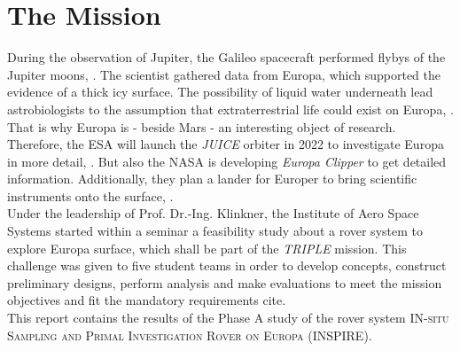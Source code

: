 %
%
%
\chapter{The Mission}
\label{chap:mission}

During the observation  of Jupiter, the Galileo spacecraft performed flybys of the Jupiter moons, \cite{Mission_01}.
The scientist gathered data from Europa, which supported the evidence of a thick icy surface.
The possibility of liquid water underneath lead astrobiologists to the assumption that extraterrestrial life could exist on Europa, \cite{Mission_02}.
That is why Europa is - beside Mars - an interesting object of research.\\

Therefore, the ESA will launch the \textit{JUICE} orbiter in 2022 to investigate Europa in more detail, \cite{Mission_03}. 
But also the NASA is developing  \textit{Europa Clipper} to get detailed information.
Additionally, they plan a lander for Europer to bring scientific instruments onto the surface, \cite{Mission_04} \cite{Mission_05}.\\

Under the leadership of  Prof. Dr.-Ing. Klinkner, the Institute of Aero Space Systems started within a seminar a feasibility study about a rover system to explore Europa surface, which shall  be part of the \textit{TRIPLE} mission.
This challenge was given to five student teams in order to develop concepts, construct preliminary designs, perform analysis and make evaluations to  meet the mission objectives and fit the mandatory requirements cite. \\


This report contains the results of the Phase A study of the rover system \textsc{IN-situ Sampling and Primal Investigation Rover on Europa}  (INSPIRE).